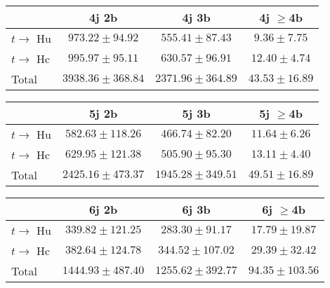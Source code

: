 \begin{table}
\begin{center}
  \begin{tabular}{ | l |  c |  c |  c | }
    \hline \hline 
     & 4j 2b  & 4j 3b  & 4j $\geq$4b  \\ 
    \hline 
     $t\rightarrow$ Hu  &   $ 973.22 \pm 94.92 $ &   $ 555.41 \pm 87.43 $ &   $ 9.36 \pm 7.75 $ \\ 
     $t\rightarrow$ Hc  &   $ 995.97 \pm 95.11 $ &   $ 630.57 \pm 96.91 $ &   $ 12.40 \pm 4.74 $ \\ 
    \hline 
    Total  &   $ 3938.36 \pm 368.84 $ &   $ 2371.96 \pm 364.89 $ &   $ 43.53 \pm 16.89 $ \\ 
    \hline \hline 
  \end{tabular} 


  \begin{tabular}{ | l |  c |  c |  c | }
    \hline \hline 
     & 5j 2b  & 5j 3b  & 5j $\geq$4b  \\ 
    \hline 
     $t\rightarrow$ Hu  &   $ 582.63 \pm 118.26 $ &   $ 466.74 \pm 82.20 $ &   $ 11.64 \pm 6.26 $ \\ 
     $t\rightarrow$ Hc  &   $ 629.95 \pm 121.38 $ &   $ 505.90 \pm 95.30 $ &   $ 13.11 \pm 4.40 $ \\ 
    \hline 
    Total  &   $ 2425.16 \pm 473.37 $ &   $ 1945.28 \pm 349.51 $ &   $ 49.51 \pm 16.89 $ \\ 
    \hline \hline 
  \end{tabular} 


  \begin{tabular}{ | l |  c |  c |  c | }
    \hline \hline 
     & 6j 2b  & 6j 3b  & 6j $\geq$4b  \\ 
    \hline 
     $t\rightarrow$ Hu  &   $ 339.82 \pm 121.25 $ &   $ 283.30 \pm 91.17 $ &   $ 17.79 \pm 19.87 $ \\ 
     $t\rightarrow$ Hc  &   $ 382.64 \pm 124.78 $ &   $ 344.52 \pm 107.02 $ &   $ 29.39 \pm 32.42 $ \\ 
    \hline 
    Total  &   $ 1444.93 \pm 487.40 $ &   $ 1255.62 \pm 392.77 $ &   $ 94.35 \pm 103.56 $ \\ 
    \hline \hline 
  \end{tabular} 


\end{center}
\end{table}
